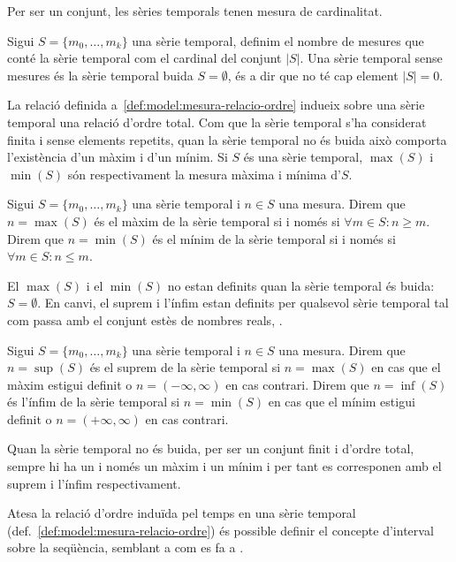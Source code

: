 Per ser un conjunt, les sèries temporals tenen mesura de cardinalitat.
\begin{definition}[Cardinal]
Sigui $S=\{m_0,\ldots,m_k\}$ una sèrie temporal, definim el nombre de
mesures que conté la sèrie temporal com el cardinal del conjunt
$|S|$. Una sèrie temporal sense mesures és la sèrie temporal buida $S=
\emptyset$, és a dir que no té cap element $|S|=0$.
\end{definition}

La relació definida a~\ref{def:model:mesura-relacio-ordre} indueix
sobre una sèrie temporal una relació d'ordre total. Com que la sèrie
temporal s'ha considerat finita i sense elements repetits, quan la
sèrie temporal no és buida això comporta l'existència d'un màxim i
d'un mínim.  Si $S$ és una sèrie temporal, $\max(S)$ i $\min(S)$ són
respectivament la mesura màxima i mínima d'$S$.

\begin{definition}
  Sigui $S=\{m_0,\ldots,m_k\}$ una sèrie temporal i $n\in S$ una
  mesura.  Direm que $n=\max(S)$ és el màxim de la sèrie temporal si i
  només si $\forall m \in S: n \geq m $.  Direm que $n=\min(S)$ és el
  mínim de la sèrie temporal si i només si $\forall m \in S: n \leq
  m$.
\end{definition}

El $\max(S)$ i el $\min(S)$ no estan definits quan la sèrie temporal
és buida: $S= \emptyset$. En
canvi, el suprem i l'ínfim estan definits per qualsevol
sèrie temporal tal com passa amb el conjunt estès de nombres reals,
\cite{cantrell:extendedreal}.  

\begin{definition}
  Sigui $S=\{m_0,\ldots,m_k\}$ una sèrie temporal i $n\in S$ una
  mesura.  Direm que $n=\sup(S)$ és el suprem de la sèrie temporal si
  $n=\max(S)$ en cas que el màxim estigui definit o
  $n=(-\infty,\infty)$ en cas contrari.  Direm que $n=\inf(S)$ és
  l'ínfim de la sèrie temporal si $n=\min(S)$ en cas que el mínim
  estigui definit o $n=(+\infty,\infty)$ en cas contrari.
\end{definition}
Quan la sèrie temporal no és buida, per
ser un conjunt finit i d'ordre total, sempre hi ha un i només un màxim
i un mínim i per tant es corresponen amb el suprem i l'ínfim
respectivament.


Atesa la relació d'ordre induïda pel temps en una sèrie temporal
(def.\ \ref{def:model:mesura-relacio-ordre}) és possible definir el
concepte d'interval sobre la seqüència, semblant a com es fa a \cite{last:keogh,last:hetland}.

